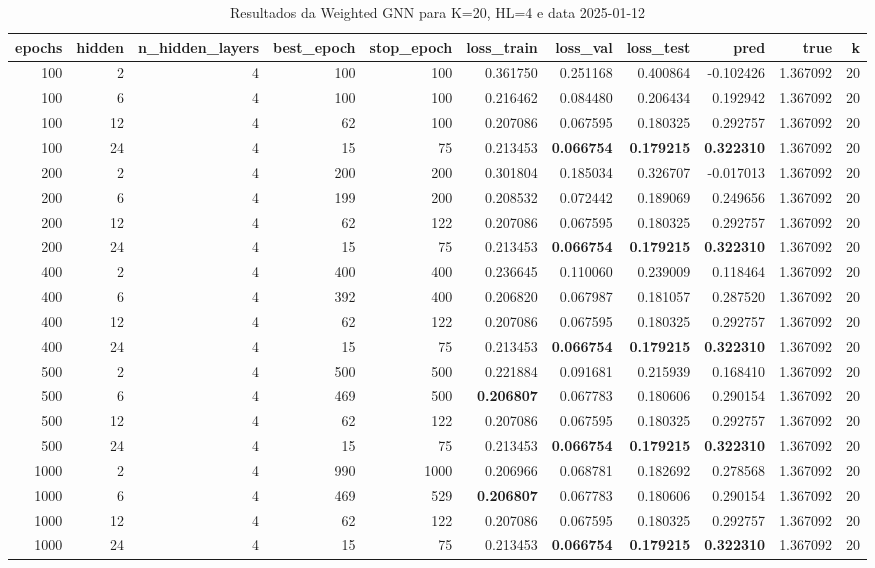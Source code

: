 \begin{table}
\caption{Resultados da Weighted GNN para K=20, HL=4 e data 2025-01-12}
\label{tab:weighted_gnn_results_k20_hl4_d20250112}
\begin{tabular}{rrrrrrrrrrr}
\toprule
epochs & hidden & n\_hidden\_layers & best\_epoch & stop\_epoch & loss\_train & loss\_val & loss\_test & pred & true & k \\
\midrule
100 & 2 & 4 & 100 & 100 & 0.361750 & 0.251168 & 0.400864 & -0.102426 & 1.367092 & 20 \\
100 & 6 & 4 & 100 & 100 & 0.216462 & 0.084480 & 0.206434 & 0.192942 & 1.367092 & 20 \\
100 & 12 & 4 & 62 & 100 & 0.207086 & 0.067595 & 0.180325 & 0.292757 & 1.367092 & 20 \\
100 & 24 & 4 & 15 & 75 & 0.213453 & \textbf{0.066754} & \textbf{0.179215} & \textbf{0.322310} & 1.367092 & 20 \\
200 & 2 & 4 & 200 & 200 & 0.301804 & 0.185034 & 0.326707 & -0.017013 & 1.367092 & 20 \\
200 & 6 & 4 & 199 & 200 & 0.208532 & 0.072442 & 0.189069 & 0.249656 & 1.367092 & 20 \\
200 & 12 & 4 & 62 & 122 & 0.207086 & 0.067595 & 0.180325 & 0.292757 & 1.367092 & 20 \\
200 & 24 & 4 & 15 & 75 & 0.213453 & \textbf{0.066754} & \textbf{0.179215} & \textbf{0.322310} & 1.367092 & 20 \\
400 & 2 & 4 & 400 & 400 & 0.236645 & 0.110060 & 0.239009 & 0.118464 & 1.367092 & 20 \\
400 & 6 & 4 & 392 & 400 & 0.206820 & 0.067987 & 0.181057 & 0.287520 & 1.367092 & 20 \\
400 & 12 & 4 & 62 & 122 & 0.207086 & 0.067595 & 0.180325 & 0.292757 & 1.367092 & 20 \\
400 & 24 & 4 & 15 & 75 & 0.213453 & \textbf{0.066754} & \textbf{0.179215} & \textbf{0.322310} & 1.367092 & 20 \\
500 & 2 & 4 & 500 & 500 & 0.221884 & 0.091681 & 0.215939 & 0.168410 & 1.367092 & 20 \\
500 & 6 & 4 & 469 & 500 & \textbf{0.206807} & 0.067783 & 0.180606 & 0.290154 & 1.367092 & 20 \\
500 & 12 & 4 & 62 & 122 & 0.207086 & 0.067595 & 0.180325 & 0.292757 & 1.367092 & 20 \\
500 & 24 & 4 & 15 & 75 & 0.213453 & \textbf{0.066754} & \textbf{0.179215} & \textbf{0.322310} & 1.367092 & 20 \\
1000 & 2 & 4 & 990 & 1000 & 0.206966 & 0.068781 & 0.182692 & 0.278568 & 1.367092 & 20 \\
1000 & 6 & 4 & 469 & 529 & \textbf{0.206807} & 0.067783 & 0.180606 & 0.290154 & 1.367092 & 20 \\
1000 & 12 & 4 & 62 & 122 & 0.207086 & 0.067595 & 0.180325 & 0.292757 & 1.367092 & 20 \\
1000 & 24 & 4 & 15 & 75 & 0.213453 & \textbf{0.066754} & \textbf{0.179215} & \textbf{0.322310} & 1.367092 & 20 \\
\bottomrule
\end{tabular}
\end{table}


